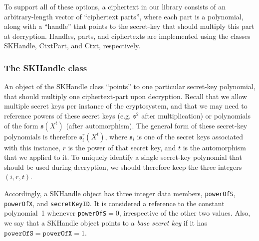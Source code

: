\documentclass[14pt]{extarticle}
\def\Ctxt{\textsf{Ctxt}}
\def\SKHandle{\textsf{SKHandle}}
\def\CtxtPart{\textsf{CtxtPart}}
\newcommand{\sk}{\mathfrak{s}}
\begin{document}
To support all of these options, a ciphertext in our library
consists of an arbitrary-length vector of ``ciphertext parts'',
where each part is a polynomial, along with a ``handle''
that points to the secret-key that should multiply this part at
decryption. Handles, parts, and ciphertexts are implemented
using the classes {\SKHandle}, {\CtxtPart}, and {\Ctxt}, respectively.

\subsubsection{The {\SKHandle} class}\label{sec:SKHandle}
An object of the {\SKHandle} class ``points'' to one particular
secret-key polynomial, that should multiply one ciphertext-part
upon decryption. Recall that we allow multiple secret
keys per instance of the cryptosystem, and that we may need to
reference powers of these secret keys (e.g. $\sk^2$ after
multiplication) or polynomials of the form $\sk(X^t)$ (after
automorphism). The general form of these secret-key polynomials is
therefore $\sk_i^r(X^t)$, where $\sk_i$ is one of the secret keys
associated with this instance, $r$ is the power of that secret key,
and $t$ is the automorphism that we applied to it. To uniquely
identify a single secret-key polynomial that should be used during
decryption, we should therefore keep the three integers $(i,r,t)$.

Accordingly, a {\SKHandle} object has three integer data members,
\texttt{powerOfS}, \texttt{powerOfX}, and \texttt{secretKeyID}.
It is considered a reference to the constant polynomial~1 whenever
\texttt{powerOfS}$=0$, irrespective of the other two values. Also, we
say that a {\SKHandle} object points to a \emph{base secret key} if
it has $\mathtt{powerOfS}=\mathtt{powerOfX}=1$. 
\end{document}
